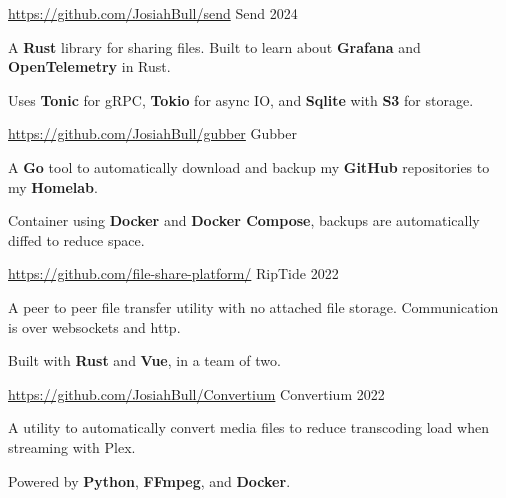 \begin{cventries}
  \cventry
    {\href{https://github.com/JosiahBull/send}{\faLink \space https://github.com/JosiahBull/send}}
    {Send}
    {}
    {2024}
    {
      \begin{cvitems}
        \item {A \textbf{Rust} library for sharing files. Built to learn about \textbf{Grafana} and \textbf{OpenTelemetry} in Rust.}
        \item {Uses \textbf{Tonic} for gRPC, \textbf{Tokio} for async IO, and \textbf{Sqlite} with \textbf{S3} for storage.}
      \end{cvitems}
    }

  \cventry
    {\href{https://github.com/JosiahBull/gubber}{\faLink \space https://github.com/JosiahBull/gubber}}
    {Gubber}
    {}
    {} %
    {
      \begin{cvitems}
        \item {A \textbf{Go} tool to automatically download and backup my \textbf{GitHub} repositories to my \textbf{Homelab}.}
        \item {Container using \textbf{Docker} and \textbf{Docker Compose}, backups are automatically diffed to reduce space.}
      \end{cvitems}
    }

  \cventry
    {\href{https://github.com/file-share-platform}{\faLink \space https://github.com/file-share-platform/}} %
    {RipTide}
    {}
    {2022}
    {
      \begin{cvitems} %
        \item {A peer to peer file transfer utility with no attached file storage. Communication is over websockets and http.}
        \item {Built with \textbf{Rust} and \textbf{Vue}, in a team of two.}
      \end{cvitems}
    }

  \cventry
  {\href{https://github.com/JosiahBull/Convertium}{\faLink \space https://github.com/JosiahBull/Convertium}} %
  {Convertium}
  {}
  {2022}
  {
    \begin{cvitems} %
      \item {A utility to automatically convert media files to reduce transcoding load when streaming with Plex.}
      \item {Powered by \textbf{Python}, \textbf{FFmpeg}, and \textbf{Docker}.}
    \end{cvitems}
  }


\end{cventries}
